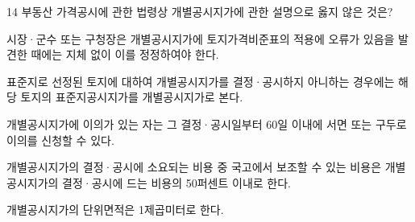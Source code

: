 \begin{question}{14}
부동산 가격공시에 관한 법령상 개별공시지가에 관한 설명으로 옳지 않은 것은?
\begin{choices}
  \item 시장·군수 또는 구청장은 개별공시지가에 토지가격비준표의 적용에 오류가 있음을 발견한 때에는 지체 없이 이를 정정하여야 한다.
  \item 표준지로 선정된 토지에 대하여 개별공시지가를 결정·공시하지 아니하는 경우에는 해당 토지의 표준지공시지가를 개별공시지가로 본다.
  \item 개별공시지가에 이의가 있는 자는 그 결정·공시일부터 60일 이내에 서면 또는 구두로 이의를 신청할 수 있다.
  \item 개별공시지가의 결정·공시에 소요되는 비용 중 국고에서 보조할 수 있는 비용은 개별공시지가의 결정·공시에 드는 비용의 50퍼센트 이내로 한다.
  \item 개별공시지가의 단위면적은 1제곱미터로 한다.
\end{choices}
\end{question}
